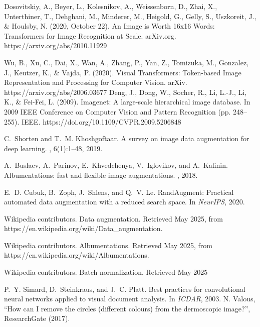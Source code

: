 \begin{thebibliography}{}




Dosovitskiy, A., Beyer, L., Kolesnikov, A., Weissenborn, D., Zhai, X., Unterthiner, T., Dehghani, M., Minderer, M., Heigold, G., Gelly, S., Uszkoreit, J., \& Houlsby, N. (2020, October 22). An Image is Worth 16x16 Words: Transformers for Image Recognition at Scale. arXiv.org. https://arxiv.org/abs/2010.11929

Wu, B., Xu, C., Dai, X., Wan, A., Zhang, P., Yan, Z., Tomizuka, M., Gonzalez, J., Keutzer, K., \& Vajda, P. (2020). Visual Transformers: Token-based Image Representation and Processing for Computer Vision. arXiv. https://arxiv.org/abs/2006.03677
Deng, J., Dong, W., Socher, R., Li, L.-J., Li, K., \& Fei-Fei, L. (2009). Imagenet: A large-scale hierarchical image database. In 2009 IEEE Conference on Computer Vision and Pattern Recognition (pp. 248–255). IEEE. https://doi.org/10.1109/CVPR.2009.5206848

C.~Shorten and T.~M. Khoshgoftaar.
\newblock A survey on image data augmentation for deep learning.
, 6(1):1--48, 2019.

A.~Buslaev, A.~Parinov, E.~Khvedchenya, V.~Iglovikov, and A.~Kalinin.
\newblock Albumentations: fast and flexible image augmentations.
, 2018.

E.~D. Cubuk, B.~Zoph, J.~Shlens, and Q.~V. Le.
\newblock RandAugment: Practical automated data augmentation with a reduced
  search space.
\newblock In {\em NeurIPS}, 2020.

Wikipedia contributors.
\newblock Data augmentation.
\newblock Retrieved May 2025, from https://en.wikipedia.org/wiki/Data\_augmentation.

Wikipedia contributors.
\newblock Albumentations.
\newblock Retrieved May 2025, from https://en.wikipedia.org/wiki/Albumentations.

Wikipedia contributors.
\newblock Batch normalization.
\newblock Retrieved May 2025

P.~Y. Simard, D.~Steinkraus, and J.~C. Platt.
\newblock Best practices for convolutional neural networks applied to visual
  document analysis.
\newblock In {\em ICDAR}, 2003.
N. Valous, “How can I remove the circles (different colours) from the dermoscopic image?”, ResearchGate (2017).


\end{thebibliography}
